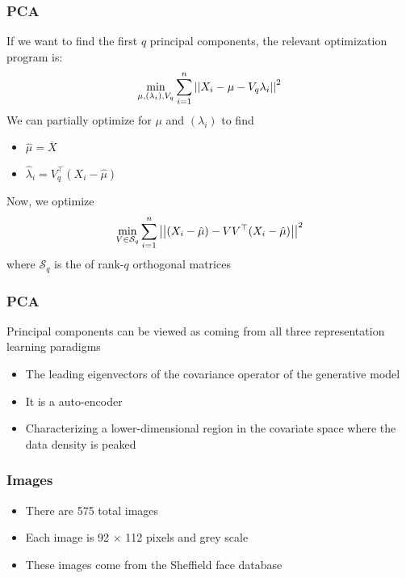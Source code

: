 \documentclass[12pt]{beamer}
\begin{document}
\begin{frame}[fragile]
\frametitle{PCA}
If we want to find the first $q$ principal components,
the relevant optimization program  is:
\[
\min_{\mu,(\lambda_i),V_q} \sum_{i=1}^n \left|\left| X_i - \mu - V_q \lambda_i \right|\right|^2
\]
We can partially optimize for $\mu$ and $(\lambda_i)$ to find
\begin{itemize}
\item $\hat\mu = \overline{X}$
\item $\hat\lambda_i = V_q^{\top}(X_i - \hat \mu)$
\end{itemize}
\vsp

Now, we optimize
\[
\min_{V \in \mathcal{S}_q} \sum_{i=1}^n \left|\left| (X_i - \hat\mu) - V V^{\top}(X_i - \hat\mu) \right|\right|^2
\]
where $ \mathcal{S}_q$ is the  of rank-$q$ orthogonal matrices

\end{frame}

\begin{frame}[fragile]
\frametitle{PCA}
Principal components can be viewed as coming from all three representation learning paradigms

\begin{itemize}
\item {} The leading eigenvectors of the covariance operator of the 
generative model
\item {} It is a  auto-encoder
\item {} Characterizing a lower-dimensional region in the covariate space where
the data density is peaked
\end{itemize}

\end{frame}

\begin{frame}[fragile]
\frametitle{Images}
\begin{itemize}
\item There are 575 total images
\item Each image is 92 $\times$ 112 pixels and grey scale
\item These images come from the Sheffield face database 

\end{itemize}
\end{frame}
\end{document}
